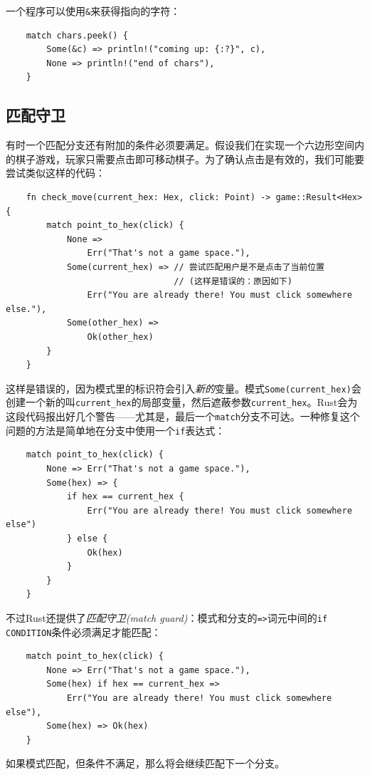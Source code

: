 一个程序可以使用\texttt{\&}来获得指向的字符：
\begin{verbatim}
    match chars.peek() {
        Some(&c) => println!("coming up: {:?}", c),
        None => println!("end of chars"),
    }
\end{verbatim}

\subsection{匹配守卫}
有时一个匹配分支还有附加的条件必须要满足。假设我们在实现一个六边形空间内的棋子游戏，玩家只需要点击即可移动棋子。为了确认点击是有效的，我们可能要尝试类似这样的代码：
\begin{verbatim}
    fn check_move(current_hex: Hex, click: Point) -> game::Result<Hex> {
        match point_to_hex(click) {
            None =>
                Err("That's not a game space."),
            Some(current_hex) => // 尝试匹配用户是不是点击了当前位置
                                 // (这样是错误的：原因如下)
                Err("You are already there! You must click somewhere else."),
            Some(other_hex) =>
                Ok(other_hex)
        }
    }
\end{verbatim}

这样是错误的，因为模式里的标识符会引入\emph{新的}变量。模式\texttt{Some(current\_hex)}会创建一个新的叫\texttt{current\_hex}的局部变量，然后遮蔽参数\texttt{current\_hex}。Rust会为这段代码报出好几个警告——尤其是，最后一个\texttt{match}分支不可达。一种修复这个问题的方法是简单地在分支中使用一个\texttt{if}表达式：
\begin{verbatim}
    match point_to_hex(click) {
        None => Err("That's not a game space."),
        Some(hex) => {
            if hex == current_hex {
                Err("You are already there! You must click somewhere else")
            } else {
                Ok(hex)
            }
        }
    }
\end{verbatim}

不过Rust还提供了\emph{匹配守卫(match guard)}：模式和分支的\texttt{=>}词元中间的\texttt{if CONDITION}条件必须满足才能匹配：
\begin{verbatim}
    match point_to_hex(click) {
        None => Err("That's not a game space."),
        Some(hex) if hex == current_hex =>
            Err("You are already there! You must click somewhere else"),
        Some(hex) => Ok(hex)
    }
\end{verbatim}

如果模式匹配，但条件不满足，那么将会继续匹配下一个分支。

